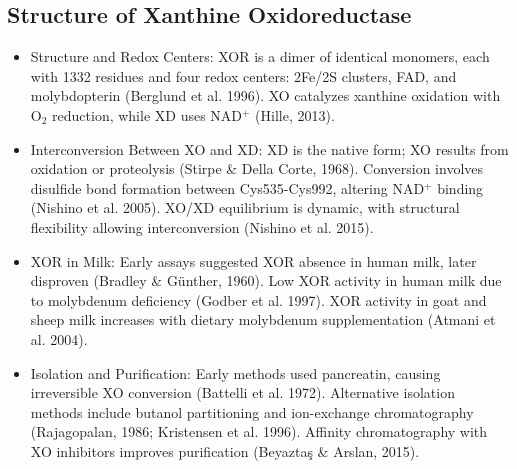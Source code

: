 \subsection*{Structure of Xanthine Oxidoreductase}
\begin{itemize}
    \item Structure and Redox Centers:
    \subitem XOR is a dimer of identical monomers, each with 1332 residues and four redox centers: 2Fe/2S clusters, FAD, and molybdopterin (Berglund et al. 1996).
    \subitem XO catalyzes xanthine oxidation with O$_2$ reduction, while XD uses NAD$^+$ (Hille, 2013).

    \item Interconversion Between XO and XD:
    \subitem XD is the native form; XO results from oxidation or proteolysis (Stirpe \& Della Corte, 1968).
    \subitem Conversion involves disulfide bond formation between Cys535-Cys992, altering NAD$^+$ binding (Nishino et al. 2005).
    \subitem XO/XD equilibrium is dynamic, with structural flexibility allowing interconversion (Nishino et al. 2015).

    \item XOR in Milk:
    \subitem Early assays suggested XOR absence in human milk, later disproven (Bradley \& Günther, 1960).
    \subitem Low XOR activity in human milk due to molybdenum deficiency (Godber et al. 1997).
    \subitem XOR activity in goat and sheep milk increases with dietary molybdenum supplementation (Atmani et al. 2004).

    \item Isolation and Purification:
    \subitem Early methods used pancreatin, causing irreversible XO conversion (Battelli et al. 1972).
    \subitem Alternative isolation methods include butanol partitioning and ion-exchange chromatography (Rajagopalan, 1986; Kristensen et al. 1996).
    \subitem Affinity chromatography with XO inhibitors improves purification (Beyaztaş \& Arslan, 2015).
\end{itemize}


